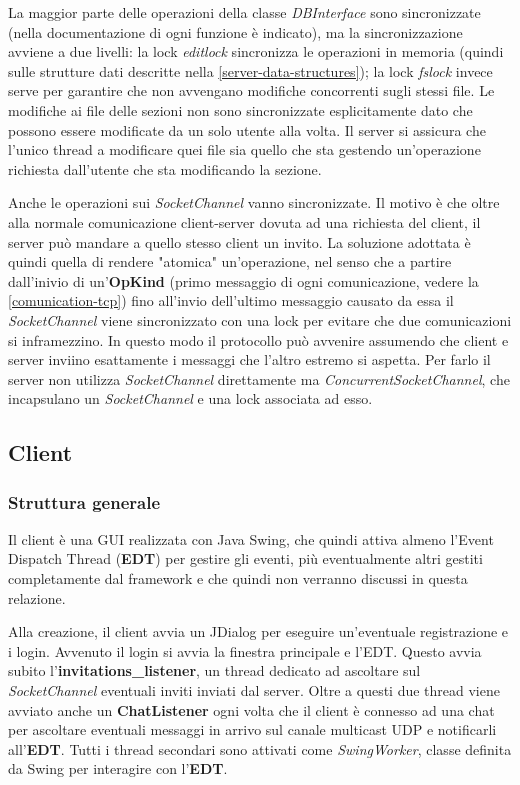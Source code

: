 \documentclass[a4paper]{article}
\theoremstyle{theorem}
\theoremstyle{remark}
\theoremstyle{definition}
\theoremstyle{corollary}
\theoremstyle{lemma}
\begin{document}
La maggior parte delle operazioni della classe \textit{DBInterface} sono sincronizzate (nella documentazione di ogni funzione è indicato), ma la sincronizzazione avviene a due livelli: la lock \textit{editlock} sincronizza le operazioni in memoria (quindi sulle strutture dati descritte nella \autoref{server-data-structures}); la lock \textit{fslock} invece serve per garantire che non avvengano modifiche concorrenti sugli stessi file. Le modifiche ai file delle sezioni non sono sincronizzate esplicitamente dato che possono essere modificate da un solo utente alla volta. Il server si assicura che l'unico thread a modificare quei file sia quello che sta gestendo un'operazione richiesta dall'utente che sta modificando la sezione.

Anche le operazioni sui \textit{SocketChannel} vanno sincronizzate. Il motivo è che oltre alla normale comunicazione client-server dovuta ad una richiesta del client, il server può mandare a quello stesso client un invito. La soluzione adottata è quindi quella di rendere "atomica" un'operazione, nel senso che a partire dall'inivio di un'\textbf{OpKind} (primo messaggio di ogni comunicazione, vedere la \autoref{comunication-tcp}) fino all'invio dell'ultimo messaggio causato da essa il \textit{SocketChannel} viene sincronizzato con una lock per evitare che due comunicazioni si inframezzino. In questo modo il protocollo può avvenire assumendo che client e server inviino esattamente i messaggi che l'altro estremo si aspetta. Per farlo il server non utilizza \textit{SocketChannel} direttamente ma \textit{ConcurrentSocketChannel}, che incapsulano un \textit{SocketChannel} e una lock associata ad esso.

\subsection{Client}
\subsubsection{Struttura generale}
Il client è una GUI realizzata con Java Swing, che quindi attiva almeno l'Event Dispatch Thread (\textbf{EDT}) per gestire gli eventi, più eventualmente altri gestiti completamente dal framework e che quindi non verranno discussi in questa relazione.

Alla creazione, il client avvia un JDialog per eseguire un'eventuale registrazione e i login. Avvenuto il login si avvia la finestra principale e l'EDT. Questo avvia subito l'\textbf{invitations\_listener}, un thread dedicato ad ascoltare sul \textit{SocketChannel} eventuali inviti inviati dal server. Oltre a questi due thread viene avviato anche un \textbf{ChatListener} ogni volta che il client è connesso ad una chat per ascoltare eventuali messaggi in arrivo sul canale multicast UDP e notificarli all'\textbf{EDT}. Tutti i thread secondari sono attivati come \textit{SwingWorker}, classe definita da Swing per interagire con l'\textbf{EDT}.
\end{document}
